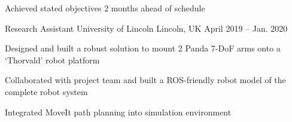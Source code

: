 \documentclass[11pt,a4paper]{awesome-cv}        %
\begin{document}
\begin{cventries}
{\begin{cvitems}
      \item Achieved stated objectives 2 months ahead of schedule
    \end{cvitems}
  }
  \cventry
  {Research Assistant}
  {University of Lincoln}
  {Lincoln, UK}
  {April 2019 -- Jan. 2020}
  {
    \begin{cvitems}
      \item Designed and built a robust solution to mount 2 Panda 7-DoF arms onto a `Thorvald' robot platform
      \item Collaborated with project team and built a ROS-friendly robot model of the complete robot system 
      \item Integrated MoveIt path planning into simulation environment
    \end{cvitems}
  }
\end{cventries}

\end{document}
